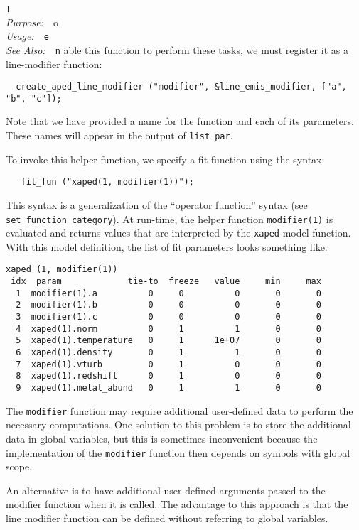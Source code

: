 \documentclass{book}
\makeatletter
\newif\ifpdf
\newenvironment{isisfunction}[4]%
{\index{{#1}@{\tt #1}}%
  \ifpdf
  \else
     \addcontentsline{toc}{subsection}{{#1} -- {#2}}
  \fi
  \vbox{
          \vspace*{\baselineskip}
          {\LARGE\tt #1}\vspace*{\baselineskip}\\
          {{\it Purpose:}~~{#2}}\\
          {{\it Usage:}~~{\tt #3}}\\
          {{\it See Also:}~~{\tt #4}}
       }
}%
{ }
\makeatother
\begin{document}
\begin{isisfunction}
To enable this function to perform these tasks, we must register it as a
line-modifier function:
\begin{verbatim}
  create_aped_line_modifier ("modifier", &line_emis_modifier, ["a", "b", "c"]);
\end{verbatim}
Note that we have provided a name for the function and each of
its parameters.  These names will appear in the output of
\verb|list_par|.

To invoke this helper function, we specify a fit-function using
the syntax:
\begin{verbatim}
   fit_fun ("xaped(1, modifier(1))");
\end{verbatim}
This syntax is a generalization of the ``operator function''
syntax (see \verb|set_function_category|).  At run-time, the
helper function \verb|modifier(1)| is evaluated and returns
values that are interpreted by the \verb|xaped| model function.
With this model definition, the list of fit parameters looks
something like:
\begin{verbatim}
xaped (1, modifier(1))
 idx  param             tie-to  freeze   value     min     max
  1  modifier(1).a          0     0          0       0       0
  2  modifier(1).b          0     0          0       0       0
  3  modifier(1).c          0     0          0       0       0
  4  xaped(1).norm          0     1          1       0       0
  5  xaped(1).temperature   0     1      1e+07       0       0
  6  xaped(1).density       0     1          1       0       0
  7  xaped(1).vturb         0     1          0       0       0
  8  xaped(1).redshift      0     1          0       0       0
  9  xaped(1).metal_abund   0     1          1       0       0
\end{verbatim}

The \verb|modifier| function may require additional user-defined data to
perform the necessary computations. One solution to this problem is to store
the additional data in global variables, but this is sometimes inconvenient
because the implementation of the \verb|modifier| function then depends on
symbols with global scope.

An alternative is to have additional user-defined arguments passed to the
modifier function when it is called.  The advantage to this approach is that
the line modifier function can be defined without referring to global
variables.


\end{isisfunction}
\end{document}
